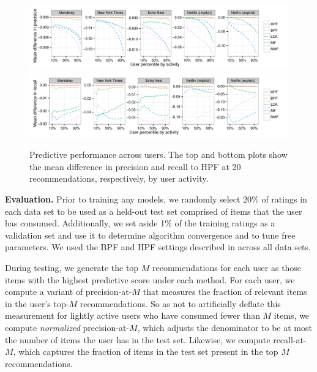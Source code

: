 \begin{figure}[t!]
\centering
\includegraphics[width=\textwidth]{figures/mean_diff_precision_at_20_by_user_percentile.pdf}\\
\includegraphics[width=\textwidth]{figures/mean_diff_recall_at_20_by_user_percentile.pdf}\\
\caption{Predictive performance across users. The top and bottom plots show the
  mean difference in precision and recall to HPF at 20 recommendations,
  respectively, by user activity.}
\label{fig:precision_recall_by_user_activity}
\end{figure}

{\bf Evaluation.} Prior to training any models, we randomly select
20\% of ratings in each data set to be used as a held-out test set
comprised of items that the user has consumed. Additionally, we set
aside 1\% of the training ratings as a validation set and use it to
determine algorithm convergence and to tune free parameters. We used
the BPF and HPF settings described in  across all
data sets.

During testing, we generate the top $M$ recommendations for each user
as those items with the highest predictive score under each
method. For each user, we compute a variant of precision-at-$M$ that
measures the fraction of relevant items in the user's top-$M$
recommendations. So as not to artificially deflate this measurement
for lightly active users who have consumed fewer than $M$ items, we
compute {\it normalized} precision-at-$M$, which adjusts the
denominator to be at most the number of items the user has in the
test set. Likewise, we compute recall-at-$M$, which captures the
fraction of items in the test set present in the top $M$
recommendations.


